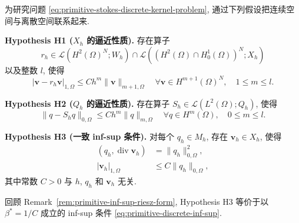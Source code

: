 为研究问题 \eqref{eq:primitive-stokes-discrete-kernel-problem},
通过下列假设把连续空间与离散空间联系起来.

\noindent\textbf{Hypothesis H1 ($X_h$ 的逼近性质).}\quad
存在算子
\[
r_h\in\mathcal L(H^2(\Omega)^N;W_h)
\cap\mathcal L((H^2(\Omega)\cap H_0^1(\Omega))^N;X_h)
\]
以及整数 $l$, 使得
\begin{equation}\label{eq:primitive-h1-approximation}
|\mathbf v-r_h\mathbf v|_{1,\Omega}
\leq Ch^m\|\mathbf v\|_{m+1,\Omega}
\quad\forall\mathbf v\in H^{m+1}(\Omega)^N,
\quad1\leq m\leq l.
\end{equation}

\noindent\textbf{Hypothesis H2 ($Q_h$ 的逼近性质).}\quad
存在算子 $S_h\in\mathcal L(L^2(\Omega);Q_h)$, 使得
\begin{equation}\label{eq:primitive-h2-approximation}
\|q-S_hq\|_{0,\Omega}
\leq Ch^m\|q\|_{m,\Omega}
\quad\forall q\in H^m(\Omega),
\quad0\leq m\leq l.
\end{equation}

\noindent\textbf{Hypothesis H3 (一致 inf-sup 条件).}\quad
对每个 $q_h\in M_h$, 存在 $\mathbf v_h\in X_h$, 使得
\begin{align}
(q_h,\operatorname{div}\mathbf v_h)&=\|q_h\|_{0,\Omega}^2,
\label{eq:primitive-h3-divergence-lifting}\\
|\mathbf v_h|_{1,\Omega}&\leq C\|q_h\|_{0,\Omega},
\label{eq:primitive-h3-stability}
\end{align}
其中常数 $C>0$ 与 $h$, $q_h$ 和 $\mathbf v_h$ 无关.

回顾 Remark~\ref{rem:primitive-inf-sup-riesz-form}, Hypothesis H3
等价于以 $\beta^*=1/C$ 成立的 inf-sup 条件
\eqref{eq:primitive-discrete-inf-sup}.
